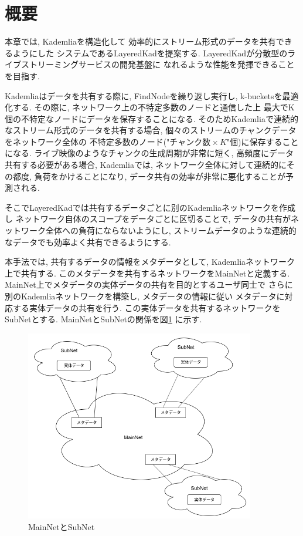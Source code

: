 \documentclass[sotsuron]{jcsie}
\begin{document}
\section{概要}
本章では, Kademliaを構造化して
効率的にストリーム形式のデータを共有できるようにした
システムであるLayeredKadを提案する.
LayeredKadが分散型のライブストリーミングサービスの開発基盤に
なれるような性能を発揮できることを目指す.

Kademliaはデータを共有する際に, 
FindNodeを繰り返し実行し, k-bucketsを最適化する.
その際に, ネットワーク上の不特定多数のノードと通信した上
最大でK個の不特定なノードにデータを保存することになる.
そのためKademliaで連続的なストリーム形式のデータを共有する場合, 
個々のストリームのチャンクデータをネットワーク全体の
不特定多数のノード("$ チャンク数 \times K $"個)に保存することになる.
ライブ映像のようなチャンクの生成周期が非常に短く, 
高頻度にデータ共有する必要がある場合, Kademliaでは, 
ネットワーク全体に対して連続的にその都度, 負荷をかけることになり, 
データ共有の効率が非常に悪化することが予測される.

そこでLayeredKadでは共有するデータごとに別のKademliaネットワークを作成し
ネットワーク自体のスコープをデータごとに区切ることで, 
データの共有がネットワーク全体への負荷にならないようにし, 
ストリームデータのような連続的なデータでも効率よく共有できるようにする.

本手法では, 共有するデータの情報をメタデータとして, 
Kademliaネットワーク上で共有する.
このメタデータを共有するネットワークをMainNetと定義する.
MainNet上でメタデータの実体データの共有を目的とするユーザ同士で
さらに別のKademliaネットワークを構築し, メタデータの情報に従い
メタデータに対応する実体データの共有を行う.
この実体データを共有するネットワークをSubNetとする.
MainNetとSubNetの関係を図\ref{fig:image}
に示す.

\begin{figure}[H]
	\centering
	\includegraphics[width=10cm]{./assets/image/image.png}
	\caption{MainNetとSubNet}
	\label{fig:image}
\end{figure}
\end{document}
